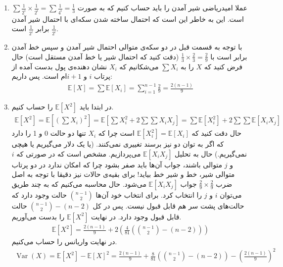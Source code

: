 \begin{enumerate}[wide, labelwidth=!, labelindent=0pt]
    \item عملا امیدریاضی شیر آمدن را باید حساب کنیم که به صورت
$\sum \frac{1}{2^i} \times \frac{1}{2^i} = \sum \frac{1}{4^i} = \frac{1}{3}$
است. این به خاطر این است که احتمال ساخته شدن سکه‌ای با احتمال شیر آمدن
$\frac{1}{2^i}$
برابر
$\frac{1}{2^i}$
است.
    \item با توجه به قسمت قبل در دو سکه‌ی متوالی احتمال شیر آمدن و سپس خط آمدن برابر است با
$\frac{1}{3} \times \frac{2}{3} = \frac{2}{9}$
(دقت کنید که احتمال شیر یا خط آمدن مستقل است)
حال فرض کنید که
$X$
را به
$\sum X_i$
می‌شکانیم که
$X_i$
نشان دهنده‌ی پول بدست آمده از پرتاب
$i$ و $i+1$ام
است. پس داریم:
\begin{gather*}
    \mathbb{E}[X] = \sum \mathbb{E}[X_i] = \sum_{i=1}^{n-1} \frac{2}{9} = \frac{2(n-1)}{9}
\end{gather*}
    \item در ابتدا باید
$\mathbb{E}[X^2]$
را حساب کنیم.
\begin{gather*}
    \mathbb{E}[X^2] = \mathbb{E}[ (\sum X_i) ^ 2] = \mathbb{E}[\sum X_i ^2 + 2 \sum \sum X_i X_j]
    = \sum \mathbb{E}[X_i ^2] + 2 \sum \sum \mathbb{E} [ X_i X_j ]
\end{gather*}
حال دقت کنید که
$\mathbb{E}[X_i ^2] = \mathbb{E}[X_i]$
است چرا که
$X_i$
تنها دو حالت 0 و 1 را دارد که اگر به توان دو نیز برسند تغییری نمی‌کنند.
(یا یک دلار می‌گیریم یا هیچی نمی‌گیریم.)
حال به تحلیل
$\mathbb{E} [ X_i X_j ]$
می‌پردازیم.
مشخص است که در صورتی که
$i$ و $j$
متوالی باشند، جواب آن‌ها باید صفر بشود چرا که امکان ندارد در دو پرتاب متوالی شیر، خط و شیر خط بیاید!
برای بقیه‌ی حالات نیز دقیقا با توجه به اصل ضرب
$\frac{2}{9} \times \frac{2}{9}$
جواب
$\mathbb{E} [ X_i X_j ]$
می‌شود. حال محاسبه می‌کنیم که به چند طریق می‌توان
$i$ و $j$
را انتخاب کرد. برای انتخاب خود آن‌ها
$n-1 \choose 2$
حالت وجود دارد که حالت‌های پشت سر هم قابل قبول نیست.
پس در کل
${n-1 \choose 2} - (n - 2)$
حالت قابل قبول وجود دارد.
در نهایت
$\mathbb{E} [ X ^2 ]$
را بدست می‌آوریم.
\begin{gather*}
    \mathbb{E} [ X^2 ] = \frac{2(n-1)}{9} + 2 (\frac{4}{81} ({n-1 \choose 2} - (n - 2)))
\end{gather*}
در نهایت واریانس را حساب می‌کنیم.
\begin{gather*}
    \operatorname{Var}(X) = \mathbb{E} [ X^2 ] - \mathbb{E} [ X ] ^2 = \frac{2(n-1)}{9} + \frac{8}{81} ({n-1 \choose 2} - (n - 2))
    - (\frac{2(n-1)}{9})^2
\end{gather*}
\end{enumerate}